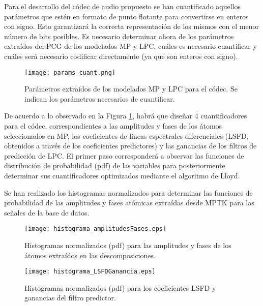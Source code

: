 Para el desarrollo del códec de audio propuesto se han cuantificado aquellos parámetros que estén en formato de punto flotante para convertirse en enteros con signo. Esto garantizará la correcta representación de los mismos con el menor número de bits posibles. Es necesario determinar ahora de los parámetros extraídos del PCG de los modelados MP y LPC, cuáles es necesario cuantificar y cuáles será necesario codificar directamente (ya que son enteros con signo).
\begin{figure}[ht]
  \centering
  \texttt{[image: params\_cuant.png]}
  \caption{Parámetros extraídos de los modelados MP y LPC para el códec. Se indican los parámetros necesarios de cuantificar.}
  \label{params}
\end{figure}

De acuerdo a lo observado en la Figura \ref{params}, habrá que diseñar 4 cuantificadores para el códec, correspondientes a las amplitudes y fases de los átomos seleccionados en MP, los coeficientes de líneas espectrales diferenciales (LSFD, obtenidos a través de los coeficientes predictores) y las ganancias de los filtros de predicción de LPC. El primer paso corresponderá a observar las funciones de distribución de probabilidad (pdf) de las variables para posteriormente determinar sus cuantificadores optimizados mediante el algoritmo de Lloyd.

Se han realizado los histogramas normalizados para determinar las funciones de probabilidad de las amplitudes y fases atómicas extraídas desde MPTK para las señales de la base de datos.
\begin{figure}[ht]
  \centering
  \texttt{[image: histograma\_amplitudesFases.eps]}
  \caption{Histogramas normalizados (pdf) para las amplitudes y fases de los átomos extraídos en las descomposiciones.}
  \label{histAmpPh}
\end{figure}

\begin{figure}[h!]
  \centering
  \texttt{[image: histograma\_LSFDGanancia.eps]}
  \caption{Histogramas normalizados (pdf) para los coeficientes LSFD y ganancias del filtro predictor.}
  \label{histLSFD}
\end{figure}


